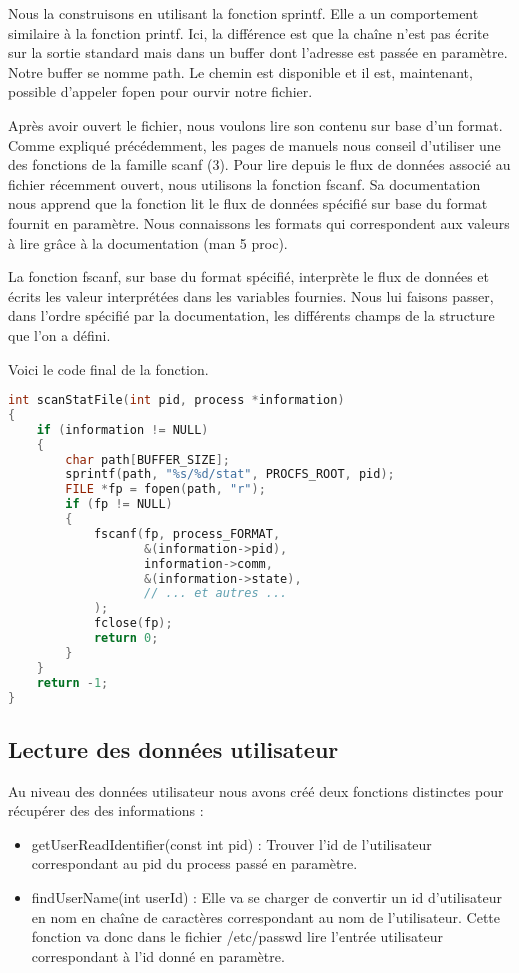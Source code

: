 Nous la construisons en utilisant la fonction sprintf. Elle a un comportement similaire à la fonction printf. Ici, la différence est que la chaîne n'est pas écrite sur la sortie standard mais dans un buffer dont l'adresse est passée en paramètre. Notre buffer se nomme path. Le chemin est disponible et il est, maintenant, possible d'appeler fopen pour ourvir notre fichier.

Après avoir ouvert le fichier, nous voulons lire son contenu sur base d'un format. Comme expliqué précédemment, les pages de manuels nous conseil d'utiliser une des fonctions de la famille scanf (3). Pour lire depuis le flux de données associé au fichier récemment ouvert, nous utilisons la fonction fscanf. Sa documentation nous apprend que la fonction lit le flux de données spécifié sur base du format fournit en paramètre. Nous connaissons les formats qui correspondent aux valeurs à lire grâce à la documentation (man 5 proc).

La fonction fscanf, sur base du format spécifié, interprète le flux de données et écrits les valeur interprétées dans les variables fournies. Nous lui faisons passer, dans l'ordre spécifié par la documentation, les différents champs de la structure que l'on a défini.

Voici le code final de la fonction. 
\begin{lstlisting}[frame=single, language=c]
int scanStatFile(int pid, process *information)
{
    if (information != NULL)
    {
        char path[BUFFER_SIZE];
        sprintf(path, "%s/%d/stat", PROCFS_ROOT, pid);
        FILE *fp = fopen(path, "r");
        if (fp != NULL)
        {
            fscanf(fp, process_FORMAT,
                   &(information->pid),
                   information->comm,
                   &(information->state),
                   // ... et autres ...
            );
            fclose(fp);
            return 0;
        }
    }
    return -1;
}
\end{lstlisting}

\subsection{Lecture des données utilisateur}
Au niveau des données utilisateur nous avons créé deux fonctions distinctes pour récupérer des des informations :

\begin{itemize}
\item getUserReadIdentifier(const int pid) : Trouver l'id de l'utilisateur correspondant au pid du process passé en paramètre.

\item findUserName(int userId) : Elle va se charger de convertir un id d’utilisateur en nom en chaîne de caractères correspondant au nom de l’utilisateur. Cette fonction va donc dans le fichier /etc/passwd lire l’entrée utilisateur correspondant à l’id donné en paramètre.
\end{itemize}

